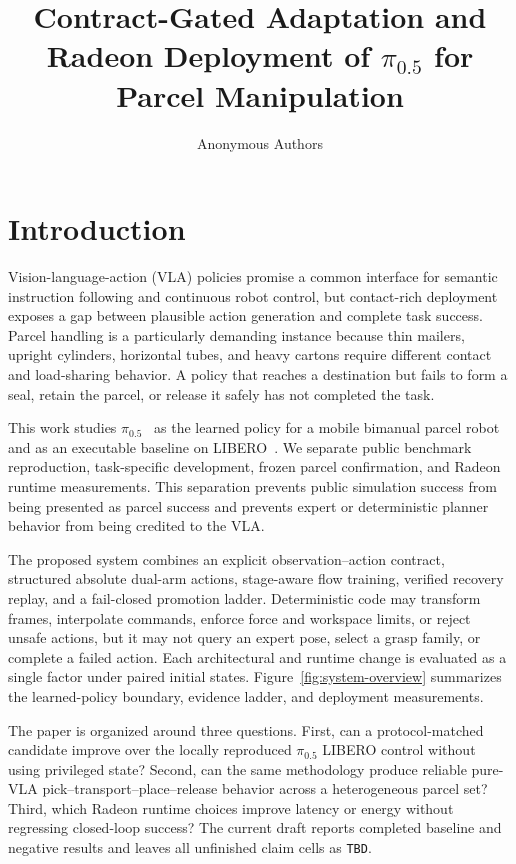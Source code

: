 \documentclass[11pt]{article}
\title{Contract-Gated Adaptation and Radeon Deployment of
$\pi_{0.5}$ for Parcel Manipulation}
\author{Anonymous Authors}
\begin{document}
\maketitle

\begin{abstract}
\end{abstract}

\section{Introduction}

Vision-language-action (VLA) policies promise a common interface for semantic
instruction following and continuous robot control, but contact-rich deployment
exposes a gap between plausible action generation and complete task success.
Parcel handling is a particularly demanding instance because thin mailers,
upright cylinders, horizontal tubes, and heavy cartons require different contact
and load-sharing behavior. A policy that reaches a destination but fails to form
a seal, retain the parcel, or release it safely has not completed the task.

This work studies $\pi_{0.5}$~\citep{pi05} as the learned policy for a mobile
bimanual parcel robot and as an executable baseline on LIBERO~\citep{libero}. We
separate public benchmark reproduction, task-specific development, frozen parcel
confirmation, and Radeon runtime measurements. This separation prevents public
simulation success from being presented as parcel success and prevents expert or
deterministic planner behavior from being credited to the VLA.

The proposed system combines an explicit observation--action contract, structured
absolute dual-arm actions, stage-aware flow training, verified recovery replay,
and a fail-closed promotion ladder. Deterministic code may transform frames,
interpolate commands, enforce force and workspace limits, or reject unsafe
actions, but it may not query an expert pose, select a grasp family, or complete a
failed action. Each architectural and runtime change is evaluated as a single
factor under paired initial states. Figure~\ref{fig:system-overview} summarizes
the learned-policy boundary, evidence ladder, and deployment measurements.

The paper is organized around three questions. First, can a protocol-matched
candidate improve over the locally reproduced $\pi_{0.5}$ LIBERO control
without using privileged state? Second, can the same methodology produce
reliable pure-VLA
pick--transport--place--release behavior across a heterogeneous parcel set?
Third, which Radeon runtime choices improve latency or energy without regressing
closed-loop success? The current draft reports completed baseline and negative
results and leaves all unfinished claim cells as \texttt{TBD}.
\end{document}
